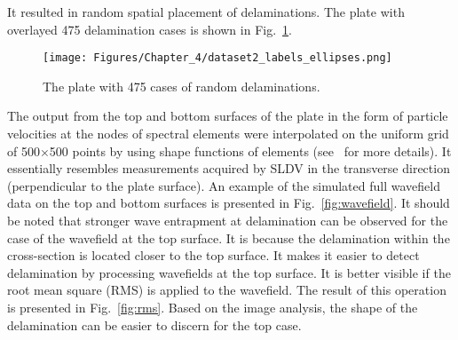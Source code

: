 It resulted in random spatial placement of delaminations. The plate with overlayed 475 delamination cases is shown in Fig.~\ref{fig:random_delam}.
\begin{figure}
	\centering
	\texttt{[image: Figures/Chapter\_4/dataset2\_labels\_ellipses.png]}
	\caption{The plate with 475 cases of random delaminations.}
	\label{fig:random_delam}
\end{figure}

The output from the top and bottom surfaces of the plate in the form of particle velocities at the nodes of spectral elements were interpolated on the uniform grid of 500\(\times\)500 points by using shape functions of elements (see~\cite{Kudela2020} for more details).
It essentially resembles measurements acquired by SLDV in the transverse direction (perpendicular to the plate surface).
An example of the simulated full wavefield data on the top and bottom surfaces is presented in Fig.~\ref{fig:wavefield}.
It should be noted that stronger wave entrapment at delamination can be observed for the case of the wavefield at the top surface.
It is because the delamination within the cross-section is located closer to the top surface.
It makes it easier to detect delamination by processing wavefields at the top surface.
It is better visible if the root mean square (RMS) is applied to the wavefield.
The result of this operation is presented in Fig.~\ref{fig:rms}.
Based on the image analysis, the shape of the delamination can be easier to discern for the top case.
